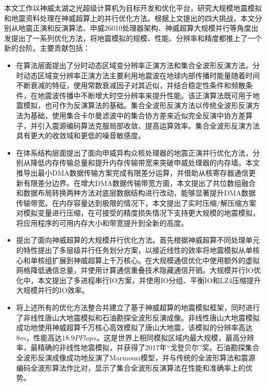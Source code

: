 本文工作以神威太湖之光超级计算机为目标开发和优化平台，研究大规模地震模拟和地震资料处理在神威超算上的并行优化方法。根据上文提出的四大挑战，本文分别从地震正演和反演算法、申威26010处理器架构、神威超算大规模并行等角度出发提出了一系列优化方法，将地震模拟的规模、性能、分辨率和精度都推上了一个新的台阶。主要贡献包括：

\begin{itemize}
  \item 在算法层面提出了分时动态区域变分辨率正演方法和集合全波形反演方法。分时动态区域变分辨率正演方法主要利用地震波在地球内部传播时能量随着时间不断衰减的特征，使用常数衰减因子对其近似，并结合稳定性条件和频散条件，在地震波传播中不断增大时空分辨率来提升性能。该正演算法既可用于地震模拟，也可作为反演算法的基础。集合全波形反演方法以传统全波形反演方法为基础，使用集合卡尔曼滤波中的集合协方差来近似完全反演中协方差算子，并引入震源编码算法克服局部收敛、提高运算效率。集合全波形反演方法具有更大的收敛域和更低的噪音敏感度。

  \item 在体系结构层面提出了面向申威异构众核处理器的地震正演并行优化方法，分别从降低内存传输总量和提升内存传输带宽来突破申威处理器的内存墙。本文推导出最小DMA数据传输方案完成有限差分运算，并借助从核寄存器通信更新有限差分边界。在增大DMA数据传输带宽方面，本文提出了共位数组融合和数据布局转换两种方法对底层数据结构进行改动，能够显著提升DMA数据传输带宽。在内存容量达到极限的情况下，本文提出了实时压缩/解压缩方案对模拟变量进行压缩，在可接受的精度损失情况下支持更大规模的地震模拟，将应用程序的可用内存大小和带宽提升到全新的高度。

  \item 提出了面向神威超算的大规模并行优化方法。首先根据神威超算不同处理单元的特性提出了多层级并行任务划分方案，以接近线性的效率将地震模拟从单核心和单核组扩展到神威超算上千万核心。在大规模通信优化中使用额外的虚拟网格降低通信总量，并使用计算通信重叠技术隐藏通信开销。大规模并行IO优化中，本文提出了多进程串行IO方案，并使用IO分组、平衡IO和LZ4压缩提升大规模并行的IO效率。

  \item 将上述所有的优化方法整合并建立了基于神威超算的地震模拟框架，同时进行了非线性唐山大地震模拟和石油勘探全波形反演成像。非线性唐山大地震模拟成功地使用神威超算千万核心高效模拟了唐山大地震，该模拟的分辨率高达$8m$，性能高达$18.9PFlops$。这是世界上相同模拟区域内最大规模，最高分辨率，最精确的非线性地震模拟，并获得了2017年“戈登贝尔”奖。石油勘探集合全波形反演成像成功地反演了Marmousi模型，并与传统的全波形算法和震源编码全波形算法作比对，显示了集合全波形反演算法在性能和准确率上的优势。

\end{itemize}

